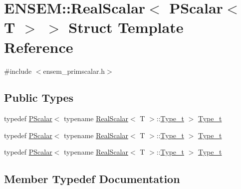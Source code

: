 \hypertarget{structENSEM_1_1RealScalar_3_01PScalar_3_01T_01_4_01_4}{}\section{E\+N\+S\+EM\+:\+:Real\+Scalar$<$ P\+Scalar$<$ T $>$ $>$ Struct Template Reference}
\label{structENSEM_1_1RealScalar_3_01PScalar_3_01T_01_4_01_4}


{\ttfamily \#include $<$ensem\+\_\+primscalar.\+h$>$}

\subsection*{Public Types}
\begin{DoxyCompactItemize}
\item 
typedef \mbox{\hyperlink{classENSEM_1_1PScalar}{P\+Scalar}}$<$ typename \mbox{\hyperlink{structENSEM_1_1RealScalar}{Real\+Scalar}}$<$ T $>$\+::\mbox{\hyperlink{structENSEM_1_1RealScalar_3_01PScalar_3_01T_01_4_01_4_a904a917e492c04b2e0f09ff24b5c6f1c}{Type\+\_\+t}} $>$ \mbox{\hyperlink{structENSEM_1_1RealScalar_3_01PScalar_3_01T_01_4_01_4_a904a917e492c04b2e0f09ff24b5c6f1c}{Type\+\_\+t}}
\item 
typedef \mbox{\hyperlink{classENSEM_1_1PScalar}{P\+Scalar}}$<$ typename \mbox{\hyperlink{structENSEM_1_1RealScalar}{Real\+Scalar}}$<$ T $>$\+::\mbox{\hyperlink{structENSEM_1_1RealScalar_3_01PScalar_3_01T_01_4_01_4_a904a917e492c04b2e0f09ff24b5c6f1c}{Type\+\_\+t}} $>$ \mbox{\hyperlink{structENSEM_1_1RealScalar_3_01PScalar_3_01T_01_4_01_4_a904a917e492c04b2e0f09ff24b5c6f1c}{Type\+\_\+t}}
\item 
typedef \mbox{\hyperlink{classENSEM_1_1PScalar}{P\+Scalar}}$<$ typename \mbox{\hyperlink{structENSEM_1_1RealScalar}{Real\+Scalar}}$<$ T $>$\+::\mbox{\hyperlink{structENSEM_1_1RealScalar_3_01PScalar_3_01T_01_4_01_4_a904a917e492c04b2e0f09ff24b5c6f1c}{Type\+\_\+t}} $>$ \mbox{\hyperlink{structENSEM_1_1RealScalar_3_01PScalar_3_01T_01_4_01_4_a904a917e492c04b2e0f09ff24b5c6f1c}{Type\+\_\+t}}
\end{DoxyCompactItemize}


\subsection{Member Typedef Documentation}
\mbox{\label{structENSEM_1_1RealScalar_3_01PScalar_3_01T_01_4_01_4_a904a917e492c04b2e0f09ff24b5c6f1c}} 
